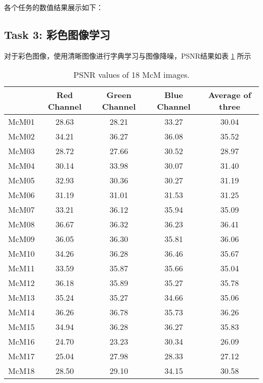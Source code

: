\documentclass[10.5pt]{myarticle}
\begin{document}
各个任务的数值结果展示如下：

\subsection{Task 3: 彩色图像学习}

对于彩色图像，使用清晰图像进行字典学习与图像降噪，PSNR结果如表 \ref{tab:result_task3} 所示

\begin{table}[H]
	\centering
	\caption{PSNR values of 18 McM images.}
	\label{tab:result_task3}
	\begin{tabular}{|c|c|c|c|c|}
		\hline
		 & Red Channel & Green Channel & Blue Channel & Average of three \\ \hline
		McM01 & 28.63  & 28.21  & 33.27  & 30.04   \\ \hline
		McM02 & 34.21  & 36.27  & 36.08  & 35.52   \\ \hline
		McM03 & 28.72  & 27.66  & 30.52  & 28.97   \\ \hline
		McM04 & 30.14  & 33.98  & 30.07  & 31.40   \\ \hline
		McM05 & 32.93  & 30.36  & 30.27  & 31.19   \\ \hline
		McM06 & 31.19  & 31.01  & 31.53  & 31.25   \\ \hline
		McM07 & 33.21  & 36.12  & 35.94  & 35.09   \\ \hline
		McM08 & 36.67  & 36.32  & 36.23  & 36.41   \\ \hline
		McM09 & 36.05  & 36.30  & 35.81  & 36.06   \\ \hline
		McM10 & 34.26  & 36.28  & 36.46  & 35.67   \\ \hline
		McM11 & 33.59  & 35.87  & 35.66  & 35.04   \\ \hline
		McM12 & 36.18  & 35.89  & 35.27  & 35.78   \\ \hline
		McM13 & 35.24  & 35.27  & 34.66  & 35.06   \\ \hline
		McM14 & 36.26  & 36.78  & 35.73  & 36.26   \\ \hline
		McM15 & 34.94  & 36.28  & 36.27  & 35.83   \\ \hline
		McM16 & 24.70  & 23.23  & 30.34  & 26.09   \\ \hline
		McM17 & 25.04  & 27.98  & 28.33  & 27.12   \\ \hline
		McM18 & 28.50  & 29.10  & 34.15  & 30.58   \\ \hline
	\end{tabular}
\end{table}
\end{document}
